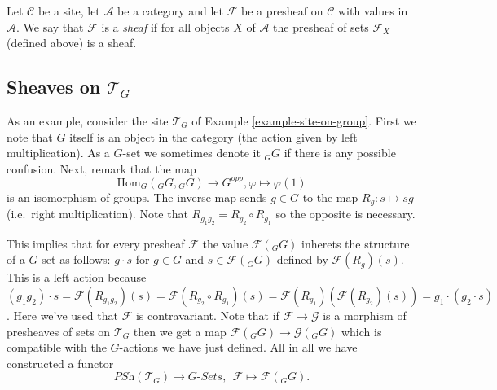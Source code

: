 \begin{definition}
\label{definition-sheaf}
Let $\mathcal{C}$ be a site, let $\mathcal{A}$ be a category
and let $\mathcal{F}$ be a presheaf on $\mathcal{C}$ with values in
$\mathcal{A}$. We say that $\mathcal{F}$ is a {\it sheaf}
if for all objects $X$ of $\mathcal{A}$ the presheaf of sets
$\mathcal{F}_X$ (defined above) is a sheaf.
\end{definition}

\subsection{Sheaves on $\mathcal{T}_G$}
\label{example-sheaf-G-sets}

\noindent
As an example, consider
the site $\mathcal{T}_G$ of Example \ref{example-site-on-group}.
First we note that $G$ itself is an object in the category
(the action given by left multiplication). As a $G$-set we sometimes
denote it ${}_GG$ if there is any possible confusion.
Next, remark that the map
$$
\text{Hom}_G({}_GG,{}_GG)
\longrightarrow
G^{opp}, 
\varphi
\longmapsto
\varphi(1)
$$
is an isomorphism of groups. The inverse map sends $g \in G$
to the map $R_g : s \mapsto sg$ (i.e.\ right multiplication).
Note that $R_{g_1g_2} = R_{g_2} \circ R_{g_1}$ so the opposite
is necessary.

\medskip\noindent
This implies that for every presheaf $\mathcal{F}$ the value
$\mathcal{F}({}_GG)$ inherets the structure of a $G$-set 
as follows: $g \cdot s$ for $g \in G$ and $s \in \mathcal{F}({}_GG)$
defined by $\mathcal{F}(R_g)(s)$. This is a left action
because $(g_1g_2) \cdot s  = \mathcal{F}(R_{g_1g_2})(s) =
\mathcal{F}(R_{g_2}\circ R_{g_1})(s) = 
\mathcal{F}(R_{g_1})( \mathcal{F}(R_{g_2})(s)) =
g_1 \cdot (g_2 \cdot s)$. Here we've used that $\mathcal{F}$
is contravariant. Note that if $\mathcal{F} \to \mathcal{G}$
is a morphism of presheaves of sets on $\mathcal{T}_G$
then we get a map $\mathcal{F}({}_GG) \to \mathcal{G}({}_GG)$
which is compatible with the $G$-actions we have just defined.
All in all we have constructed a functor
$$
\textit{PSh}(\mathcal{T}_G)
\longrightarrow
G\textit{-Sets},\ \ 
\mathcal{F}
\longmapsto
\mathcal{F}({}_GG).
$$


